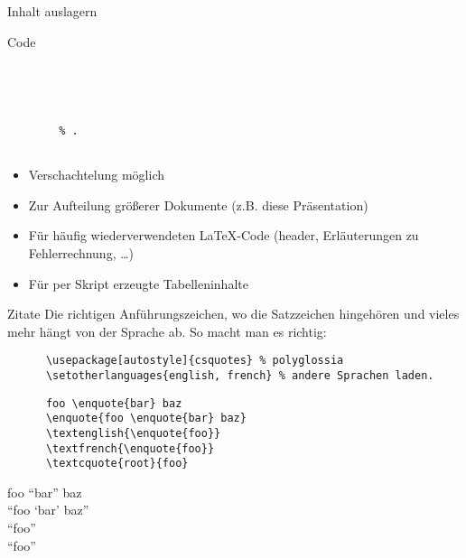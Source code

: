 \begin{frame}[fragile]{Inhalt auslagern}
  \begin{block}{Code}
    \begin{lstlisting}
      
      
        
        
        % .
      
    \end{lstlisting}
  \end{block}
  \begin{itemize}
    \item Verschachtelung möglich
    \item Zur Aufteilung größerer Dokumente (z.B. diese Präsentation)
    \item Für häufig wiederverwendeten \LaTeX-Code (header, Erläuterungen zu Fehlerrechnung, …)
    \item Für per Skript erzeugte Tabelleninhalte
  \end{itemize}
\end{frame}

\begin{frame}[fragile]{Zitate}
  Die richtigen Anführungszeichen, wo die Satzzeichen hingehören und vieles mehr hängt von der Sprache ab.
  So macht man es richtig:
  \begin{Packages}
    \begin{lstlisting}
      \usepackage[autostyle]{csquotes} % polyglossia
      \setotherlanguages{english, french} % andere Sprachen laden.
    \end{lstlisting}
  \end{Packages}
  \begin{CodeExample}{0.60}
    \begin{lstlisting}
      foo \enquote{bar} baz
      \enquote{foo \enquote{bar} baz}
      \textenglish{\enquote{foo}}
      \textfrench{\enquote{foo}}
      \textcquote{root}{foo}
    \end{lstlisting}
  \CodeResult
    foo \enquote{bar} baz \\
    \enquote{foo \enquote{bar} baz} \\
    \textenglish{\enquote{foo}} \\
    \textfrench{ \enquote{foo}} \\
  \end{CodeExample}
\end{frame}
